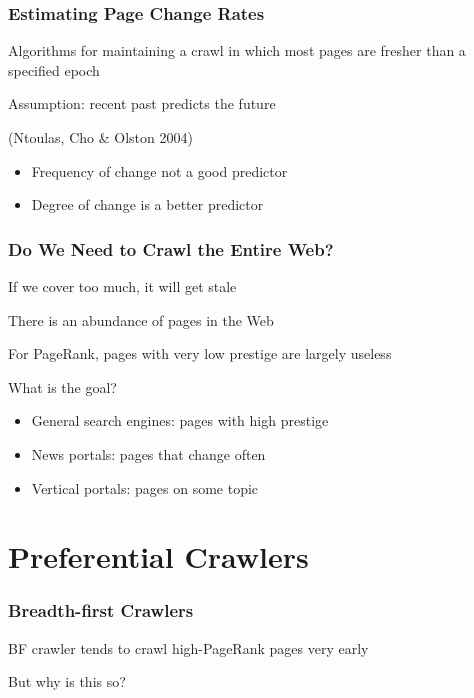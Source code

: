 \documentclass{beamer}
\begin{document}
\begin{frame} \frametitle{Estimating Page Change Rates}

Algorithms for maintaining a crawl in which most pages are fresher than a specified epoch

\vfill
\begin{block}{Assumption: recent past predicts the future} 

(Ntoulas, Cho \& Olston 2004)

\begin{itemize}
\item Frequency of change not a good predictor
\item Degree of change is a better predictor
\end{itemize}
\end{block}

\end{frame}


\begin{frame} \frametitle{Do We Need to Crawl the Entire Web?}
If we cover too much, it will get stale

There is an abundance of pages in the Web

For PageRank, pages with very low prestige are largely  useless

\begin{block}{What is the goal?}

\begin{itemize}
\item General search engines: pages with high prestige 
\item News portals: pages that change often
\item Vertical portals: pages on some topic
\end{itemize}
\end{block}


\end{frame}

\section{Preferential Crawlers}


\begin{frame} \frametitle{Breadth-first Crawlers}

BF crawler tends to crawl high-PageRank pages very early


But why is this so?

\end{frame}
\end{document}
